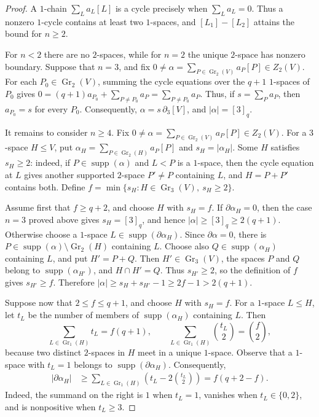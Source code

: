 \documentclass[11pt]{article}
\numberwithin{equation}{section}
\newcommand{\Gr}{\operatorname{Gr}}
\newcommand{\supp}{\operatorname{supp}}
\begin{document}
\begin{proof}
A $1$-chain $\sum_L a_L[L]$ is a cycle precisely when $\sum_L a_L=0$. Thus a
nonzero $1$-cycle contains at least two $1$-spaces, and
$[L_1]-[L_2]$ attains the bound for $n\ge2$.

For $n<2$ there are no $2$-spaces, while for $n=2$ the unique
$2$-space has nonzero boundary. Suppose that $n=3$, and fix
$0\ne\alpha=\sum_{P\in\Gr_2(V)}a_P[P]\in Z_2(V)$. For each
$P_0\in\Gr_2(V)$, summing the cycle equations over the $q+1$
$1$-spaces of $P_0$ gives
$0=(q+1)a_{P_0}+\sum_{P\ne P_0}a_P=\sum_{P\ne P_0}a_P$.
Thus, if $s=\sum_Pa_P$, then $a_{P_0}=s$ for every $P_0$.
Consequently, $\alpha=s\,\partial_3[V]$, and $|\alpha|=[3]_q$.

It remains to consider $n\ge4$. Fix
$0\ne\alpha=\sum_{P\in\Gr_2(V)}a_P[P]\in Z_2(V)$. For a $3$-space
$H\le V$, put
$\alpha_H=\sum_{P\in\Gr_2(H)}a_P[P]$ and $s_H=|\alpha_H|$.
Some $H$ satisfies $s_H\ge2$: indeed, if
$P\in\supp(\alpha)$ and $L<P$ is a $1$-space, then the cycle equation
at $L$ gives another supported $2$-space $P'\ne P$ containing $L$,
and $H=P+P'$ contains both. Define
$f=\min\{s_H:H\in\Gr_3(V),\ s_H\ge2\}$.

Assume first that $f\ge q+2$, and choose $H$ with $s_H=f$. If
$\partial\alpha_H=0$, then the case $n=3$ proved above gives
$s_H=[3]_q$, and hence $|\alpha|\ge[3]_q\ge2(q+1)$. Otherwise choose
a $1$-space
$L\in\supp(\partial\alpha_H)$. Since $\partial\alpha=0$, there is
$P\in\supp(\alpha)\setminus\Gr_2(H)$ containing $L$. Choose also
$Q\in\supp(\alpha_H)$ containing $L$, and put $H'=P+Q$. Then
$H'\in\Gr_3(V)$, the spaces $P$ and $Q$ belong to
$\supp(\alpha_{H'})$, and $H\cap H'=Q$. Thus $s_{H'}\ge2$, so the
definition of $f$ gives $s_{H'}\ge f$. Therefore
$|\alpha|\ge s_H+s_{H'}-1\ge2f-1>2(q+1)$.

Suppose now that $2\le f\le q+1$, and choose $H$ with $s_H=f$. For
a $1$-space $L\le H$, let $t_L$ be the number of members of
$\supp(\alpha_H)$ containing $L$. Then
\[
 \sum_{L\in\Gr_1(H)}t_L=f(q+1),
 \qquad
 \sum_{L\in\Gr_1(H)}\binom{t_L}{2}=\binom f2,
\]
because two distinct $2$-spaces in $H$ meet in a unique $1$-space. Observe that a
$1$-space with $t_L=1$ belongs to $\supp(\partial\alpha_H)$. Consequently, 
\begin{align*}
 |\partial\alpha_H|
 &\ge
 \sum_{L\in\Gr_1(H)}\left(t_L-2\binom{t_L}{2}\right)
 =f(q+2-f).
\end{align*}
Indeed, the summand on the right is $1$ when $t_L=1$, vanishes when
$t_L\in\{0,2\}$, and is nonpositive when $t_L\ge3$.


\end{proof}
\end{document}
